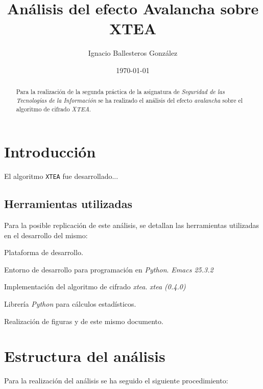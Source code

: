 \documentclass[11pt,a4paper]{article}
\title{Análisis del efecto Avalancha sobre XTEA}
\author{Ignacio Ballesteros González}
\date{\today}
\begin{document}
\maketitle
\tableofcontents
\begin{abstract}
  Para la realización de la segunda práctica de la asignatura de
  \emph{Seguridad de las Tecnologías de la Información} se ha
  realizado el análisis del efecto \emph{avalancha} sobre el algoritmo de
  cifrado \emph{XTEA}.
\end{abstract}

\section{Introducción}

El algoritmo \texttt{XTEA} fue desarrollado...

\subsection{Herramientas utilizadas}

Para la posible replicación de este análisis, se detallan las
herramientas utilizadas en el desarrollo del mismo:

\begin{description}[align=left] %
\item [Python 2 y 3] Plataforma de desarrollo.
\item [Emacs] Entorno de desarrollo para programación en \emph{Python}. \emph{Emacs 25.3.2}
\item [xtea] Implementación del algoritmo de cifrado \emph{xtea}. \emph{xtea (0.4.0)}
\item [scipy] Librería \emph{Python} para cálculos estadísticos.
\item [\LaTeX] Realización de figuras y de este mismo documento.
\end{description}

\section{Estructura del análisis}

Para la realización del análisis se ha seguido el siguiente
procedimiento:
\end{document}
